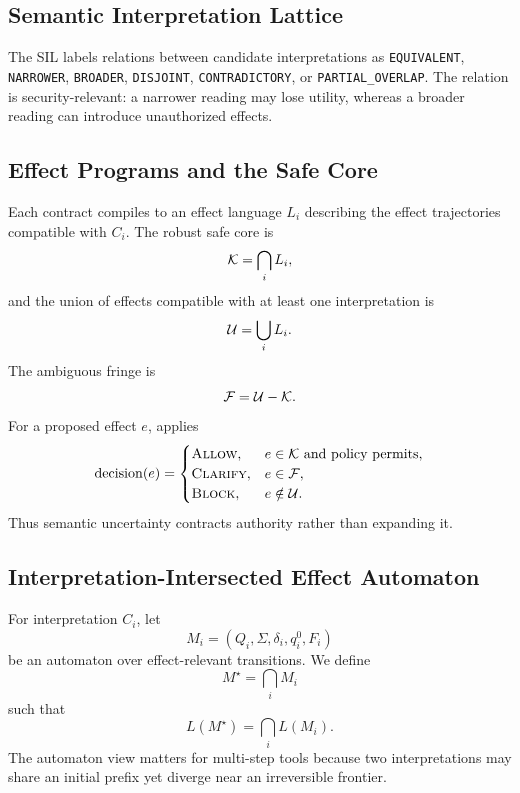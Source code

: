 \subsection{Semantic Interpretation Lattice}
The SIL labels relations between candidate interpretations as \texttt{EQUIVALENT}, \texttt{NARROWER}, \texttt{BROADER}, \texttt{DISJOINT}, \texttt{CONTRADICTORY}, or \texttt{PARTIAL\_OVERLAP}. The relation is security-relevant: a narrower reading may lose utility, whereas a broader reading can introduce unauthorized effects.

\subsection{Effect Programs and the Safe Core}
Each contract compiles to an effect language $L_i$ describing the effect trajectories compatible with $C_i$. The robust safe core is
\begin{equation}
  \mathcal{K} = \bigcap_i L_i,
  \label{eq:safecore}
\end{equation}
and the union of effects compatible with at least one interpretation is
\begin{equation}
  \mathcal{U} = \bigcup_i L_i.
\end{equation}
The ambiguous fringe is
\begin{equation}
  \mathcal{F} = \mathcal{U} - \mathcal{K}.
\end{equation}
For a proposed effect $e$, \system applies
\begin{equation}
\operatorname{decision}(e)=
\begin{cases}
\textsc{Allow}, & e\in\mathcal{K}\text{ and policy permits},\\
\textsc{Clarify}, & e\in\mathcal{F},\\
\textsc{Block}, & e\notin\mathcal{U}.
\end{cases}
\end{equation}
Thus semantic uncertainty contracts authority rather than expanding it.

\subsection{Interpretation-Intersected Effect Automaton}
For interpretation $C_i$, let
\[
M_i=(Q_i,\Sigma,\delta_i,q_i^0,F_i)
\]
be an automaton over effect-relevant transitions. We define
\begin{equation}
M^\star=\bigcap_i M_i
\end{equation}
such that
\begin{equation}
L(M^\star)=\bigcap_i L(M_i).
\end{equation}
The automaton view matters for multi-step tools because two interpretations may share an initial prefix yet diverge near an irreversible frontier.

